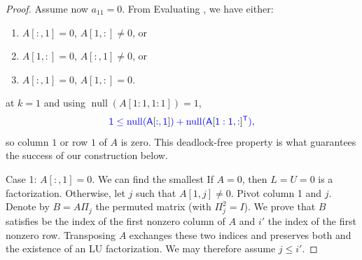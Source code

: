 \documentclass[10pt,twoside]{siamart1116}
\DeclareMathOperator{\nl}{null}
\numberwithin{theorem}{section}
\providecommand{\DIFadd}[1]{{\protect\color{blue} \sf #1}} %
\providecommand{\DIFdel}[1]{{\protect\color{red} \scriptsize #1}} %
\providecommand{\DIFaddbegin}{} %
\providecommand{\DIFaddend}{} %
\providecommand{\DIFdelbegin}{} %
\providecommand{\DIFdelend}{} %
\begin{document}
\begin{proof}
  Assume \DIFaddbegin \DIFadd{now }\DIFaddend $a_{11} = 0$. \DIFdelbegin \DIFdel{From }\DIFdelend \DIFaddbegin \DIFadd{Evaluating }\DIFaddend {} \DIFdelbegin \DIFdel{, we have either:
	}%
\begin{enumerate}%
\item%
\DIFdel{$A[:,1] = 0$, $A[1,:] \ne 0$, or }%
\item%
\DIFdel{$A[1,:] = 0$, $A[:,1] \ne 0$, or
		}%
\item%
\DIFdel{$A[:,1] = 0$, $A[1,:] = 0$. }
\end{enumerate}%
\DIFdelend \DIFaddbegin \DIFadd{at $k = 1$ and using $\nl(A[1:1,1:1]) = 1$,
  }\begin{equation}\DIFadd{\label{eq:deadlock}
    1 \le \nl(A}[\DIFadd{:,1}]\DIFadd{) + \nl(}{\DIFadd{A}[\DIFadd{1:1,:}]}\DIFadd{^T),
  }\end{equation}
  \DIFadd{so column $1$ or row $1$ of $A$ is zero. This deadlock-free property is what guarantees the success of our construction below.
}\DIFaddend 

  \DIFdelbegin \DIFdel{Case 1: $A[:,1] = 0$. We can find the smallest }\DIFdelend \DIFaddbegin \DIFadd{If $A = 0$, then $L = U = 0$ is a factorization. Otherwise, let }\DIFaddend $j$ \DIFdelbegin \DIFdel{such that $A[1,j] \neq 0$. Pivot column 1 and $j$. Denote by $B = A \Pi_j$ the permuted matrix (with $\Pi_j^2 = I$). We prove that $B$ satisfies }\DIFdelend \DIFaddbegin \DIFadd{be the index of the first nonzero column of $A$ and $i'$ the index of the first nonzero row. Transposing $A$ exchanges these two indices and preserves both }\DIFaddend {} \DIFaddbegin \DIFadd{and the existence of an LU factorization. We may therefore assume $j \le i'$}\DIFaddend .


\end{proof}
\end{document}
